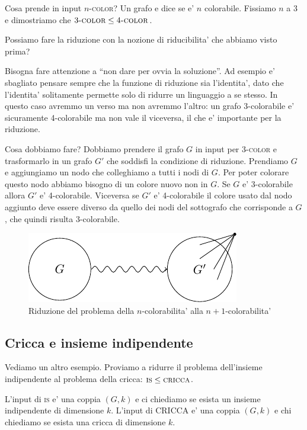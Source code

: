 Cosa prende in input $n$\textsc{-color}? Un grafo e dice se e' $n$ colorabile. Fissiamo $n$ a 3 e dimostriamo
che $3\textsc{-color} \leq 4\textsc{-color}$.

Possiamo fare la riduzione con la nozione di riducibilita' che abbiamo visto prima?

Bisogna fare attenzione a ``non dare per ovvia la soluzione''. Ad esempio e' sbagliato pensare
sempre che la funzione di riduzione sia l'identita', dato che l'identita' solitamente permette solo
di ridurre un linguaggio a se stesso. In questo caso avremmo un verso ma non avremmo l'altro: un
grafo 3-colorabile e' sicuramente 4-colorabile ma non vale il viceversa, il che e' importante per la
riduzione.

Cosa dobbiamo fare? Dobbiamo prendere il grafo $G$ in input per 3\textsc{-color} e trasformarlo in
un grafo $G'$ che soddisfi la condizione di riduzione. Prendiamo $G$ e aggiungiamo un nodo che
colleghiamo a tutti i nodi di $G$. Per poter colorare questo nodo abbiamo bisogno di un colore nuovo
non in $G$.  Se $G$ e' 3-colorabile allora $G'$ e' 4-colorabile. Viceversa se $G'$ e' 4-colorabile
il colore usato dal nodo aggiunto deve essere diverso da quello dei nodi del sottografo che
corrisponde a $G$, che quindi risulta 3-colorabile.

\begin{figure}[h]
    \begin{center}
        \includegraphics{img/3COL4COL.pdf}
    \end{center}
    \caption{Riduzione del problema della $n$-colorabilita' alla $n+1$-colorabilita'}
\end{figure}

\subsection{Cricca e insieme indipendente}

Vediamo un altro esempio. Proviamo a ridurre il problema dell'insieme indipendente al problema della
cricca: $\textsc{is} \leq \textsc{cricca}$.

L'input di \textsc{is} e' una coppia $(G,k)$ e ci chiediamo se esista un insieme indipendente di
dimensione $k$. L'input di CRICCA e' una coppia $(G,k)$ e chi chiediamo se esista una cricca di
dimensione $k$.

